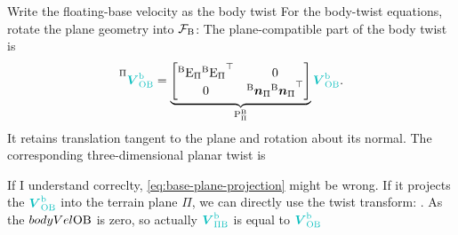\documentclass[10pt]{article}
\begin{document}
Write the floating-base velocity as the body twist
For the body-twist equations, rotate the plane geometry into $\cframe[fb]$:
The plane-compatible part of the body twist is
\begin{equation}
  \label{eq:base-plane-projection}
  \prescript{\Pi}{}{\bodyVel{\inertialFrame}{\fbFrame}}
  =
  \underbrace{
    \begin{bmatrix}
      {}^{\fbFrame}\text{E}_{\Pi}
        \transpose{{}^{\fbFrame}\text{E}_{\Pi}} & \zeroMatrix\\
      \zeroMatrix &
        {}^{\fbFrame}\surfaceNormal_{\Pi}
        \transpose{{}^{\fbFrame}\surfaceNormal_{\Pi}}
    \end{bmatrix}
  }_{\text{P}^{\fbFrame}_{\Pi}}
  \bodyVel{\inertialFrame}{\fbFrame}.
\end{equation}
It retains translation tangent to the plane and rotation about its normal.
The corresponding three-dimensional planar twist is

If I understand correclty, \eqref{eq:base-plane-projection} might be wrong. If it projects the $\bodyVel{\inertialFrame}{\fbFrame}$ into the terrain plane $\Pi$, we can directly use the twist transform: 
. As the $bodyVel{\text{O}}{\text{B}}$ is zero, so actually $\bodyVel{\Pi}{\fbFrame}$ is equal to $\bodyVel{\inertialFrame}{\fbFrame}$
\end{document}
